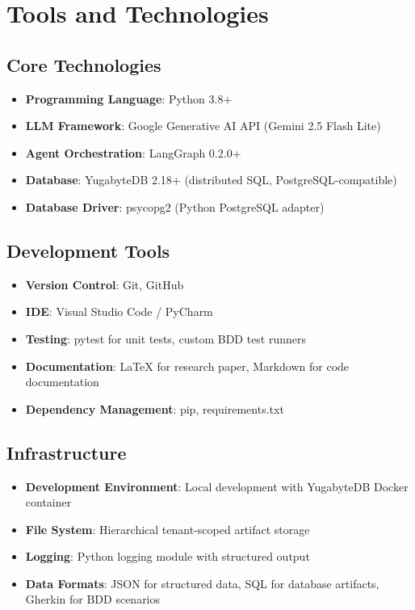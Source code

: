 \documentclass[12pt,a4paper]{article}
\begin{document}
\newpage
\section{Tools and Technologies}

\subsection{Core Technologies}

\begin{itemize}
\item \textbf{Programming Language}: Python 3.8+
\item \textbf{LLM Framework}: Google Generative AI API (Gemini 2.5 Flash Lite)
\item \textbf{Agent Orchestration}: LangGraph 0.2.0+
\item \textbf{Database}: YugabyteDB 2.18+ (distributed SQL, PostgreSQL-compatible)
\item \textbf{Database Driver}: psycopg2 (Python PostgreSQL adapter)
\end{itemize}

\subsection{Development Tools}

\begin{itemize}
\item \textbf{Version Control}: Git, GitHub
\item \textbf{IDE}: Visual Studio Code / PyCharm
\item \textbf{Testing}: pytest for unit tests, custom BDD test runners
\item \textbf{Documentation}: LaTeX for research paper, Markdown for code documentation
\item \textbf{Dependency Management}: pip, requirements.txt
\end{itemize}

\subsection{Infrastructure}

\begin{itemize}
\item \textbf{Development Environment}: Local development with YugabyteDB Docker container
\item \textbf{File System}: Hierarchical tenant-scoped artifact storage
\item \textbf{Logging}: Python logging module with structured output
\item \textbf{Data Formats}: JSON for structured data, SQL for database artifacts, Gherkin for BDD scenarios
\end{itemize}
\end{document}
